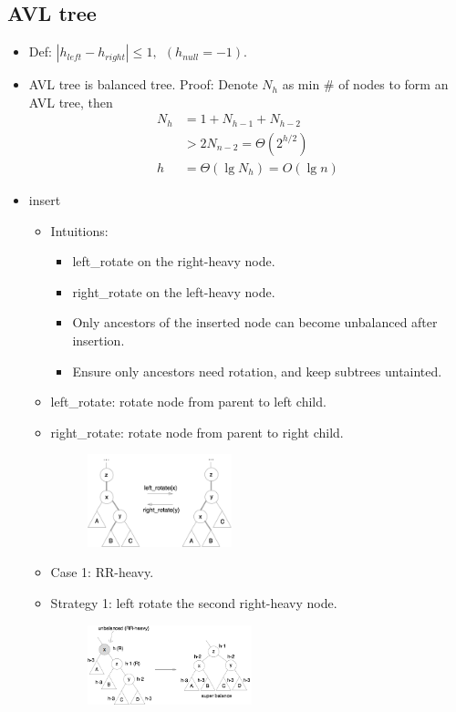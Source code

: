 \documentclass[twocolumn]{article}
\begin{document}
\subsection{AVL tree}
\begin{itemize}
\item Def: $|h_{left} - h_{right}| \le 1,\ \  (h_{null} = -1)$.

\item AVL tree is balanced tree. Proof: Denote $N_h$ as min \# of nodes to form an AVL tree, then
  \begin{align*}
  N_h &= 1 + N_{h-1} + N_{h-2}
  \\&> 2 N_{n-2} = \Theta(2^{h/2})
  \\
  h &= \Theta(\lg N_h) = O(\lg n)
  \end{align*}

\item insert
  \begin{itemize}
  \item Intuitions:
    \begin{itemize}
    \item left\_rotate on the right-heavy node.
    \item right\_rotate on the left-heavy node.
    \item Only ancestors of the inserted node can become unbalanced after insertion.
    \item Ensure only ancestors need rotation, and keep subtrees untainted.
    \end{itemize}
  \item left\_rotate: rotate node from parent to left child.
  \item right\_rotate: rotate node from parent to right child.
    \begin{figure}[H]
    \centering
    \includegraphics[width=0.42\textwidth]{assets/avl-rotate}
    \end{figure}
  \item Case 1: RR-heavy.
  \item Strategy 1: left rotate the second right-heavy node.
    \begin{figure}[H]
    \centering
    \includegraphics[width=0.48\textwidth]{assets/avl-rr}
    \end{figure}


\end{itemize}
\end{itemize}
\end{document}
